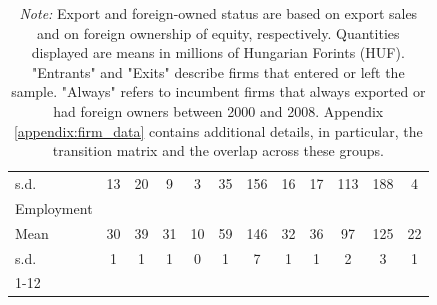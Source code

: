 \begin{table}[ht!]
{\begin{tabular}{lcccc| cccc | ccc}
\hspace{3mm} s.d. &        13 &        20 &         9 &         3 &        35 &       156 &        16 &        17 &       113 &       188 &         4\\
Employment & & & & & & & & & & &\\
\hspace{3mm} Mean &        30 &        39 &        31 &        10 &        59 &       146 &        32 &        36 &        97 &       125 &        22\\
\hspace{3mm} s.d. &         1 &         1 &         1 &         0 &         1 &         7 &         1 &         1 &         2 &         3 &         1\\
\cline{1-12}
\end{tabular}} \caption*{ \scriptsize \textit{Note:} Export and foreign-owned status are based on export sales and on foreign ownership of equity, respectively. Quantities displayed are means in millions of Hungarian Forints (HUF). "Entrants" and "Exits" describe firms that entered or left the sample. "Always" refers to incumbent firms that always exported or had foreign owners between 2000 and 2008. Appendix \ref{appendix:firm_data} contains additional details, in particular, the transition matrix and the overlap across these groups.}
\label{table:data_micro}
\vspace{-.6cm}
\end{table}

